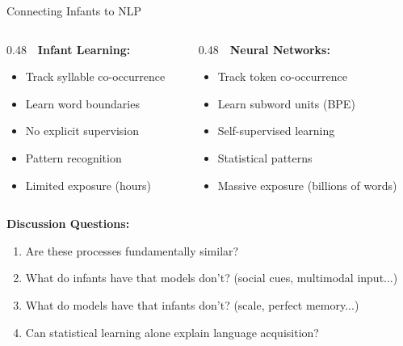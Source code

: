 \documentclass[aspectratio=169]{beamer}
\begin{document}
\begin{frame}[shrink=10]{Connecting Infants to NLP 🔄}
    \begin{columns}[T]
        \begin{column}{0.48\textwidth}
            \textbf{👶 Infant Learning:}
            \begin{itemize}\setlength{\itemsep}{0pt}
                \item Track syllable co-occurrence
                \item Learn word boundaries
                \item No explicit supervision
                \item Pattern recognition
                \item Limited exposure (hours)
            \end{itemize}
        \end{column}
        \begin{column}{0.48\textwidth}
            \textbf{🤖 Neural Networks:}
            \begin{itemize}\setlength{\itemsep}{0pt}
                \item Track token co-occurrence
                \item Learn subword units (BPE)
                \item Self-supervised learning
                \item Statistical patterns
                \item Massive exposure (billions of words)
            \end{itemize}
        \end{column}
    \end{columns}

    \vspace{1em}
    \textbf{Discussion Questions:}
    \begin{enumerate}\setlength{\itemsep}{0pt}
        \item Are these processes fundamentally similar?
        \item What do infants have that models don't? (social cues, multimodal input...)
        \item What do models have that infants don't? (scale, perfect memory...)
        \item Can statistical learning alone explain language acquisition?
    \end{enumerate}
\end{frame}
\end{document}
